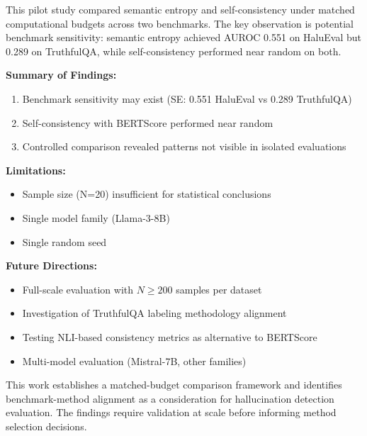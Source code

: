 
This pilot study compared semantic entropy and self-consistency under matched computational budgets across two benchmarks. The key observation is potential benchmark sensitivity: semantic entropy achieved AUROC 0.551 on HaluEval but 0.289 on TruthfulQA, while self-consistency performed near random on both.

\textbf{Summary of Findings:}
\begin{enumerate}
\item Benchmark sensitivity may exist (SE: 0.551 HaluEval vs 0.289 TruthfulQA)
\item Self-consistency with BERTScore performed near random
\item Controlled comparison revealed patterns not visible in isolated evaluations
\end{enumerate}

\textbf{Limitations:}
\begin{itemize}
\item Sample size (N=20) insufficient for statistical conclusions
\item Single model family (Llama-3-8B)
\item Single random seed
\end{itemize}

\textbf{Future Directions:}
\begin{itemize}
\item Full-scale evaluation with $N\geq 200$ samples per dataset
\item Investigation of TruthfulQA labeling methodology alignment
\item Testing NLI-based consistency metrics as alternative to BERTScore
\item Multi-model evaluation (Mistral-7B, other families)
\end{itemize}

This work establishes a matched-budget comparison framework and identifies benchmark-method alignment as a consideration for hallucination detection evaluation. The findings require validation at scale before informing method selection decisions.
